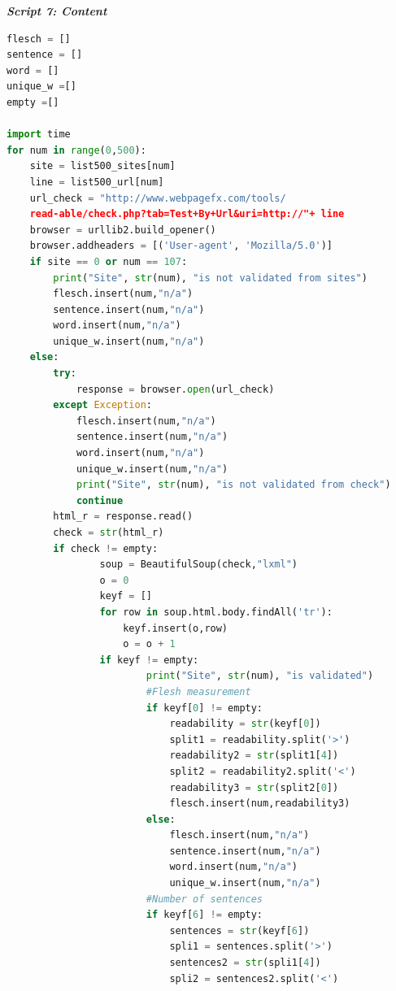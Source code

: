 \documentclass{article}
\begin{document}
\begin{center}
\textit{\textbf{Script 7: Content}}
\end{center}
\begin{lstlisting}[language=Python]
flesch = []
sentence = []
word = []
unique_w =[]
empty =[]

import time 
for num in range(0,500):
    site = list500_sites[num]
    line = list500_url[num] 
    url_check = "http://www.webpagefx.com/tools/
    read-able/check.php?tab=Test+By+Url&uri=http://"+ line
    browser = urllib2.build_opener()
    browser.addheaders = [('User-agent', 'Mozilla/5.0')]
    if site == 0 or num == 107:
        print("Site", str(num), "is not validated from sites")
        flesch.insert(num,"n/a")
        sentence.insert(num,"n/a")
        word.insert(num,"n/a")
        unique_w.insert(num,"n/a")  
    else:
        try:
            response = browser.open(url_check)
        except Exception: 
            flesch.insert(num,"n/a")
            sentence.insert(num,"n/a")
            word.insert(num,"n/a")
            unique_w.insert(num,"n/a")
            print("Site", str(num), "is not validated from check")
            continue        
        html_r = response.read()
        check = str(html_r)       
        if check != empty:                
                soup = BeautifulSoup(check,"lxml")
                o = 0
                keyf = []
                for row in soup.html.body.findAll('tr'):
                    keyf.insert(o,row)
                    o = o + 1
                if keyf != empty:                        
                        print("Site", str(num), "is validated")
                        #Flesh measurement
                        if keyf[0] != empty:
                            readability = str(keyf[0])
                            split1 = readability.split('>')
                            readability2 = str(split1[4])
                            split2 = readability2.split('<')
                            readability3 = str(split2[0])
                            flesch.insert(num,readability3)
                        else:
                            flesch.insert(num,"n/a")
                            sentence.insert(num,"n/a")
                            word.insert(num,"n/a")
                            unique_w.insert(num,"n/a")   
                        #Number of sentences   
                        if keyf[6] != empty:
                            sentences = str(keyf[6])
                            spli1 = sentences.split('>')
                            sentences2 = str(spli1[4])
                            spli2 = sentences2.split('<')

\end{lstlisting}
\end{document}
